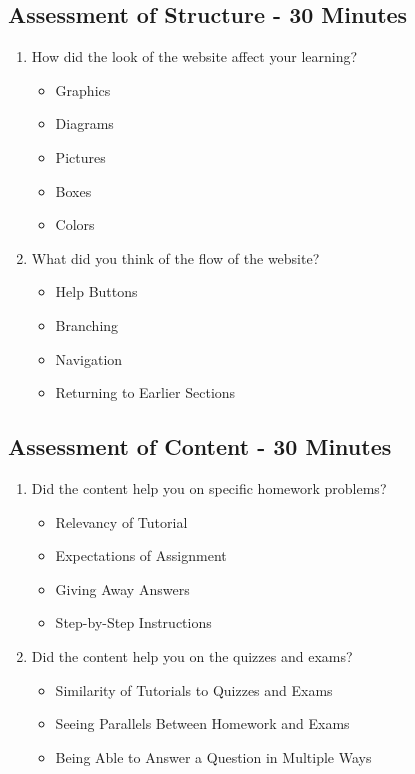 \subsection{Assessment of Structure - 30 Minutes}
\begin{enumerate}
	\item How did the look of the website affect your learning?
	\begin{itemize}
		\item Graphics
		\item Diagrams
		\item Pictures
		\item Boxes
		\item Colors
	\end{itemize}
	\item What did you think of the flow of the website?
	\begin{itemize}
		\item Help Buttons
		\item Branching
		\item Navigation
		\item Returning to Earlier Sections
	\end{itemize}
\end{enumerate}

\subsection{Assessment of Content - 30 Minutes}
\begin{enumerate}
	\item Did the content help you on specific homework problems?
	\begin{itemize}
		\item Relevancy of Tutorial
		\item Expectations of Assignment
		\item Giving Away Answers
		\item Step-by-Step Instructions
	\end{itemize}
	\item Did the content help you on the quizzes and exams?
	\begin{itemize}
		\item Similarity of Tutorials to Quizzes and Exams
		\item Seeing Parallels Between Homework and Exams
		\item Being Able to Answer a Question in Multiple Ways
	\end{itemize}
\end{enumerate}


